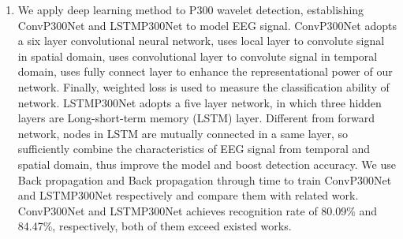 \begin{englishabstract}
\begin{enumerate}
\item We apply deep learning method to P300 wavelet detection, establishing ConvP300Net and LSTMP300Net to model EEG signal. ConvP300Net adopts a six layer convolutional neural network, uses local layer to convolute signal in spatial domain, uses convolutional layer to convolute signal in temporal domain, uses fully connect layer to enhance the representational power of our network. Finally, weighted loss is used to measure the classification ability of network. LSTMP300Net adopts a five layer network, in which three hidden layers are Long-short-term memory (LSTM) layer.  Different from forward network, nodes in LSTM are mutually connected in a same layer, so sufficiently combine the characteristics of EEG signal from temporal and spatial domain, thus improve the model and boost detection accuracy. We use Back propagation and Back propagation through time to train ConvP300Net and LSTMP300Net respectively and compare them with related work. ConvP300Net and LSTMP300Net achieves recognition rate of 80.09\% and 84.47\%, respectively, both of them exceed existed works. 

\end{enumerate}



\end{englishabstract}
